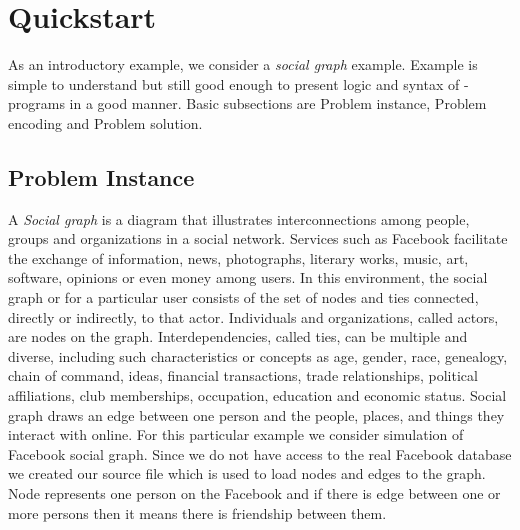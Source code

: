 \documentclass[14pt,a4paper, titlepage]{article}
\begin{document}
\section{Quickstart} %
As an introductory example, we consider a \emph{social graph} example. Example is simple to understand  but still good enough to present logic and syntax of \hex{}-programs in a good manner. Basic subsections are Problem instance, Problem encoding and Problem solution.  

\subsection{Problem Instance}
A \emph{Social graph} is a diagram that illustrates interconnections among people, groups 
and organizations in a social network. Services such as Facebook facilitate the exchange 
of information, news, photographs, literary works, music, art, software, opinions or even 
money among users. In this environment, the social graph or for a particular user consists 
of the set of nodes and ties connected, directly or indirectly, to that actor. 
Individuals and organizations, called actors, are nodes on the graph. Interdependencies, 
called ties, can be multiple and diverse, including such characteristics or concepts as age, 
gender, race, genealogy, chain of command, ideas, financial transactions, trade relationships, 
political affiliations, club memberships, occupation, education and economic status. 
Social graph draws an edge between one person and the people, places, and things they interact 
with online. For this particular example we consider simulation of Facebook social graph. 
Since we do not have access to the real Facebook database we created our source file which is 
used to load nodes and edges to the graph. Node represents one person on the Facebook and if 
there is edge between one or more persons then it means there is friendship between them.  
\end{document}
